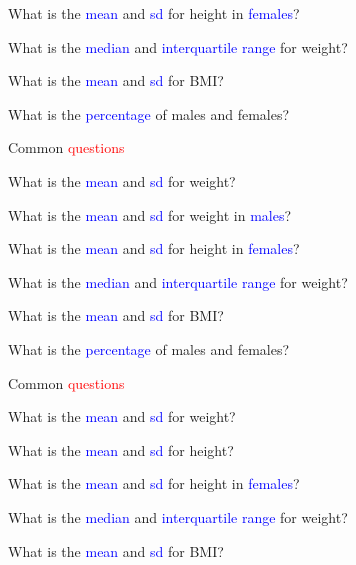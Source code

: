 \documentclass{presentatiesmetlogo}
\begin{document}
\item What is the \textcolor{blue}{mean} and \textcolor{blue}{sd} for height in \textcolor{blue}{females}?
\item What is the \textcolor{blue}{median} and \textcolor{blue}{interquartile range} for weight?
\item What is the \textcolor{blue}{mean} and \textcolor{blue}{sd} for BMI?
\item What is the  \textcolor{blue}{percentage} of males and females?
\eitemt
\eitem
\bitem
\item Common \textcolor{red}{questions}
\newline
\bitemt
\item What is the \textcolor{blue}{mean} and \textcolor{blue}{sd} for weight?
\item {}
\item What is the \textcolor{blue}{mean} and \textcolor{blue}{sd} for weight in \textcolor{blue}{males}?
\item What is the \textcolor{blue}{mean} and \textcolor{blue}{sd} for height in \textcolor{blue}{females}?
\item What is the \textcolor{blue}{median} and \textcolor{blue}{interquartile range} for weight?
\item What is the \textcolor{blue}{mean} and \textcolor{blue}{sd} for BMI?
\item What is the  \textcolor{blue}{percentage} of males and females?
\eitemt
\eitem
\bitem
\item Common \textcolor{red}{questions}
\newline
\bitemt
\item What is the \textcolor{blue}{mean} and \textcolor{blue}{sd} for weight?
\item What is the \textcolor{blue}{mean} and \textcolor{blue}{sd} for height?
\item {}
\item What is the \textcolor{blue}{mean} and \textcolor{blue}{sd} for height in \textcolor{blue}{females}?
\item What is the \textcolor{blue}{median} and \textcolor{blue}{interquartile range} for weight?
\item What is the \textcolor{blue}{mean} and \textcolor{blue}{sd} for BMI?
\end{document}
